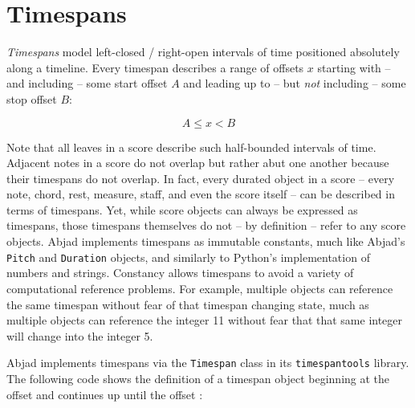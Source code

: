 \section{Timespans}
\label{sec:timespans}

\emph{Timespans} model left-closed / right-open intervals of time positioned
absolutely along a timeline. Every timespan describes a range
of offsets $x$ starting with -- and including -- some start offset $A$ and
leading up to -- but \emph{not} including -- some stop offset $B$:

\begin{equation}
A \leq x < B
\end{equation}

Note that all leaves in a score describe such half-bounded intervals of time.
Adjacent notes in a score do not overlap but rather abut one another because
their timespans do not overlap. In fact, every durated object in a score --
every note, chord, rest, measure, staff, and even the score itself -- can be
described in terms of timespans. Yet, while score objects can always be
expressed as timespans, those timespans themselves do not -- by definition
-- refer to any score objects. Abjad implements timespans as immutable
constants, much like Abjad's \texttt{Pitch} and \texttt{Duration} objects, and
similarly to Python's implementation of numbers and strings. Constancy allows
timespans to avoid a variety of computational reference problems. For example,
multiple objects can reference the same timespan without fear of that timespan
changing state, much as multiple objects can reference the integer 11 without
fear that that same integer will change into the integer 5.


Abjad implements timespans via the \texttt{Timespan} class in its
\texttt{timespantools} library. The following code shows the definition of a
timespan object beginning at the offset  and continues up until the
offset :

\begin{comment}
<abjad>
timespan = timespantools.Timespan(
    start_offset=Offset(1, 4),
    stop_offset=Offset(3, 2),
    )
</abjad>
\end{comment}

